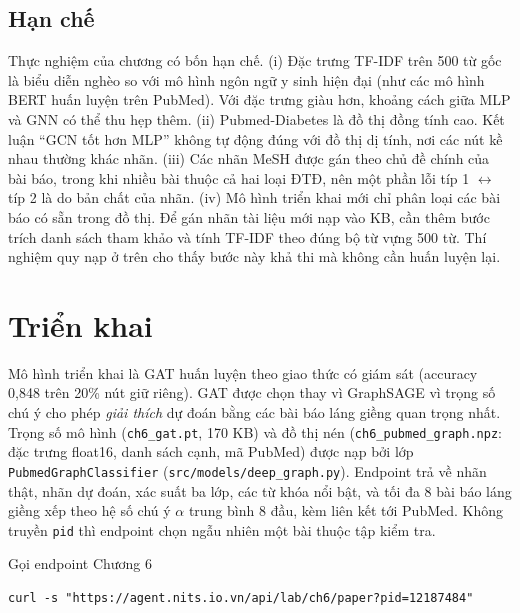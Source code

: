 \subsection{Hạn chế}

Thực nghiệm của chương có bốn hạn chế. (i) Đặc trưng TF-IDF trên 500 từ gốc là biểu diễn nghèo so với mô hình ngôn ngữ y sinh hiện đại (như các mô hình BERT huấn luyện trên PubMed). Với đặc trưng giàu hơn, khoảng cách giữa MLP và GNN có thể thu hẹp thêm. (ii) Pubmed-Diabetes là đồ thị đồng tính cao. Kết luận ``GCN tốt hơn MLP'' không tự động đúng với đồ thị dị tính, nơi các nút kề nhau thường khác nhãn. (iii) Các nhãn MeSH được gán theo chủ đề chính của bài báo, trong khi nhiều bài thuộc cả hai loại ĐTĐ, nên một phần lỗi típ 1 $\leftrightarrow$ típ 2 là do bản chất của nhãn. (iv) Mô hình triển khai mới chỉ phân loại các bài báo có sẵn trong đồ thị. Để gán nhãn tài liệu mới nạp vào KB, cần thêm bước trích danh sách tham khảo và tính TF-IDF theo đúng bộ từ vựng 500 từ. Thí nghiệm quy nạp ở trên cho thấy bước này khả thi mà không cần huấn luyện lại.



\section{Triển khai}

Mô hình triển khai là GAT huấn luyện theo giao thức có giám sát (accuracy 0,848 trên 20\% nút giữ riêng). GAT được chọn thay vì GraphSAGE vì trọng số chú ý cho phép \emph{giải thích} dự đoán bằng các bài báo láng giềng quan trọng nhất. Trọng số mô hình (\texttt{ch6\_gat.pt}, 170 KB) và đồ thị nén (\texttt{ch6\_pubmed\_graph.npz}: đặc trưng float16, danh sách cạnh, mã PubMed) được nạp bởi lớp \texttt{PubmedGraphClassifier} (\texttt{src/models/deep\_graph.py}). Endpoint  trả về nhãn thật, nhãn dự đoán, xác suất ba lớp, các từ khóa nổi bật, và tối đa 8 bài báo láng giềng xếp theo hệ số chú ý $\alpha$ trung bình 8 đầu, kèm liên kết tới PubMed. Không truyền \texttt{pid} thì endpoint chọn ngẫu nhiên một bài thuộc tập kiểm tra.

\begin{code}{Gọi endpoint Chương 6}
\label{lst:ch6-api}
\begin{verbatim}
curl -s "https://agent.nits.io.vn/api/lab/ch6/paper?pid=12187484"
\end{verbatim}
\end{code}

